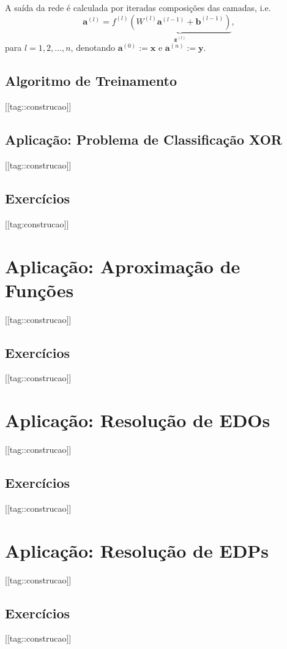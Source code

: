 A saída da rede é calculada por iteradas composições das camadas, i.e.
\begin{equation}
  \pmb{a}^{(l)} = f^{(l)}\underbrace{\left(W^{(l)}\pmb{a}^{(l-1)} + \pmb{b}^{(l-1)}\right)}_{\pmb{z}^{(l)}},
\end{equation}
para $l= 1, 2, \dotsc, n$, denotando $\pmb{a}^{(0)} := \pmb{x}$ e $\pmb{a}^{(n)} := \pmb{y}$.

\subsection{Algoritmo de Treinamento}

[[tag::construcao]]

\subsection{Aplicação: Problema de Classificação XOR}

[[tag::construcao]]

\subsection{Exercícios}

[[tag:construcao]]


\section{Aplicação: Aproximação de Funções}

[[tag::construcao]]

\subsection{Exercícios}

[[tag::construcao]]

\section{Aplicação: Resolução de EDOs}

[[tag::construcao]]

\subsection{Exercícios}

[[tag::construcao]]

\section{Aplicação: Resolução de EDPs}

[[tag::construcao]]

\subsection{Exercícios}

[[tag::construcao]]
